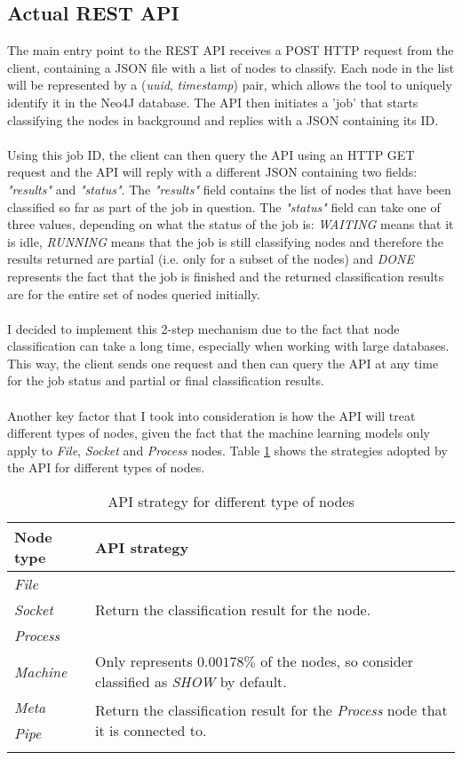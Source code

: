 	\subsection{Actual REST API} \label{Section: impl/REST/actual}
	The main entry point to the REST API receives a POST HTTP request from the client, containing a JSON file with a list of nodes to classify. Each node in the list will be represented by a (\textit{uuid}, \textit{timestamp}) pair, which allows the tool to uniquely identify it in the Neo4J database. The API then initiates a 'job' that starts classifying the nodes in background and replies with a JSON containing its ID.
	\\ \\
	Using this job ID, the client can then query the API using an HTTP GET request and the API will reply with a different JSON containing two fields: \textit{"results"} and \textit{"status"}. The \textit{"results"} field contains the list of nodes that have been classified so far as part of the job in question. The \textit{"status"} field can take one of three values, depending on what the status of the job is: \textit{WAITING} means that it is idle, \textit{RUNNING} means that the job is still classifying nodes and therefore the results returned are partial (i.e. only for a subset of the nodes) and \textit{DONE} represents the fact that the job is finished and the returned classification results are for the entire set of nodes queried initially. 
	\\ \\
	I decided to implement this 2-step mechanism due to the fact that node classification can take a long time, especially when working with large databases. This way, the client sends one request and then can query the API at any time for the job status and partial or final classification results.
	\\ \\
	Another key factor that I took into consideration is how the API will treat different types of nodes, given the fact that the machine learning models only apply to \textit{File}, \textit{Socket} and \textit{Process} nodes. Table \ref{Table: impl/REST/API-strategy} shows the strategies adopted by the API for different types of nodes.
	\begin{longtable}{|p{}|p{}|}
		\textbf{Node type} & \textbf{API strategy} \\
		\hline
		\textit{File} & \multirow{3}{*}{Return the classification result for the node.} \\
		\textit{Socket} & \\
		\textit{Process} & \\
		\hline
		\textit{Machine} & Only represents $0.00178\%$ of the nodes, so consider classified as \textit{SHOW} by default. \\
		\hline
		\textit{Meta} & \multirow{2}{*}{Return the classification result for the \textit{Process} node that it is connected to.} \\
		\textit{Pipe} &  \\
		\hline
		\caption{API strategy for different type of nodes}
		\label{Table: impl/REST/API-strategy}
 	\end{longtable}

